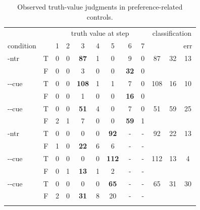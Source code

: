 \documentclass[fleqn,reqno,10pt,draft]{article}
\newcommand{\lc}{\acro{lc}}
\newcommand{\ec}{\acro{ec}}
\newcommand{\LC}{\lc}
\newcommand{\EC}{\ec}
\begin{document}
\begin{table}
  \centering
  \begin{tabular}{lcccccccc@{\hskip 0.6cm}ccc}
    && \multicolumn{7}{c}{truth value at step}
    & \multicolumn{3}{c}{classification}
    \\ \cmidrule(l){3-9} \cmidrule(r){10-12}
    condition &
    & 1
    & 2
    & 3
    & 4
    & 5
    & 6
    & 7
    & \lc
    & \ec
    & err \\ \midrule
    \lc-ntr 
    & T & 0 & 0 & \textbf{87} & 1 & 0 & 9 & 0 
    & 87 & 32 & 13 \\
    & F & 0 & 0 & 3 & 0 & 0 & \textbf{32} & 0 \\
    \addlinespace[0.25cm]
    \lc-\lc-cue
    & T & 0 & 0 & \textbf{108} & 1 & 1 & 7 & 0 
    & 108 & 16 & 10 \\
    & F & 0 & 0 & 1 & 0 & 0 & \textbf{16} & 0 \\
    \addlinespace[0.25cm]
    \lc-\ec-cue
    & T & 0 & 0 & \textbf{51} & 4 & 0 & 7 & 0 
    & 51 & 59 & 25 \\
    & F & 2 & 1 & 7 & 0 & 0 & \textbf{59} & 1 \\
    \addlinespace[0.25cm]
    \ec-ntr
    & T & 0 & 0 & 0 & 0 & \textbf{92} & - & - 
    & 92 & 22 & 13 \\
    & F & 1 & 0 & \textbf{22} & 6 & 6 & - & - \\
    \addlinespace[0.25cm]
    \ec-\lc-cue
    & T & 0 & 0 & 0 & 0 & \textbf{112} & - & - 
    & 112 & 13 & 4 \\
    & F & 0 & 1 & \textbf{13} & 1 & 2 & - & - \\
    \addlinespace[0.25cm]
    \ec-\ec-cue
    & T & 0 & 0 & 0 & 0 & \textbf{65} & - & - 
    & 65 & 31 & 30 \\
    & F & 2 & 0 & \textbf{31} & 8 & 20 & - & - \\
    \addlinespace[0.25cm]
    
  \end{tabular}
  \caption{Observed truth-value judgments in preference-related controls.}
  \label{tab:count_data_TF}
\end{table}







\end{document}
